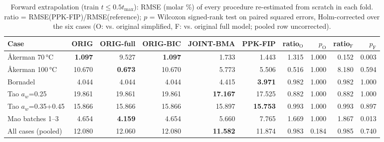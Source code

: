 \begin{table}[t]
\centering
\caption{Forward extrapolation (train $t\le0.5t_\mathrm{max}$): RMSE (molar \%) of every procedure re-estimated from scratch in each fold. ratio = RMSE(PPK-FIP)/RMSE(reference); $p$ = Wilcoxon signed-rank test on paired squared errors, Holm-corrected over the six cases (O: vs. original simplified, F: vs. original full model; pooled row uncorrected).}\label{tab:fcst}
\footnotesize
\begin{adjustbox}{max width=\linewidth}
\begin{tabular}{lrrrrrrrrr}
\toprule
Case & ORIG & ORIG-full & ORIG-BIC & JOINT-BMA & PPK-FIP & ratio$_\mathrm{O}$ & $p_\mathrm{O}$ & ratio$_\mathrm{F}$ & $p_\mathrm{F}$ \\
\midrule
Åkerman 70\,°C & \textbf{1.097} & 9.527 & \textbf{1.097} & 1.733 & 1.443 & 1.315 & 1.000 & 0.152 & 0.003 \\
Åkerman 100\,°C & 10.670 & \textbf{0.673} & 10.670 & 5.773 & 5.506 & 0.516 & 1.000 & 8.180 & 0.594 \\
Bornadel & 4.044 & 4.044 & 4.044 & 4.415 & \textbf{3.971} & 0.982 & 1.000 & 0.982 & 1.000 \\
Tao $a_w$=0.25 & 19.861 & 19.861 & 19.861 & \textbf{17.167} & 17.525 & 0.882 & 1.000 & 0.882 & 1.000 \\
Tao $a_w$=0.35+0.45 & 15.866 & 15.866 & 15.866 & 15.897 & \textbf{15.753} & 0.993 & 1.000 & 0.993 & 0.897 \\
Mao batches 1--3 & 4.654 & \textbf{4.159} & 4.654 & 5.660 & 7.765 & 1.669 & 1.000 & 1.867 & 0.013 \\
\midrule
All cases (pooled) & 12.080 & 12.060 & 12.080 & \textbf{11.582} & 11.874 & 0.983 & 0.184 & 0.985 & 0.740 \\
\bottomrule
\end{tabular}
\end{adjustbox}
\end{table}
